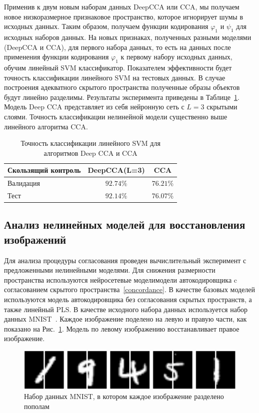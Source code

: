 \documentclass[12pt]{article}
\begin{document}
	Применив к двум новым наборам данных DeepCCA или CCA, мы получаем новое низкоразмерное признаковое пространство, которое игнорирует шумы в исходных данных. Таким образом, получаем функции кодирования $\varphi_1$ и $\psi_1$ для исходных наборов данных. На новых признаках, полученных разными моделями (DeepCCA и CCA), для первого набора данных, то есть на данных после применения функции кодирования $\varphi_1$ к первому набору исходных данных, обучим линейный SVM классификатор. Показателем эффективности будет точность классификации линейного SVM на тестовых данных. В случае построения адекватного скрытого пространства полученные образы объектов будут линейно разделимы. Результаты эксперимента приведены в Таблице~\ref{tbl:1}. Модель Deep CCA представляет из себя нейронную сеть с $L=3$ скрытыми слоями. Точность классификации нелинейной модели существенно выше линейного алгоритма CCA.
	
	\begin{table}[h!]
		\caption{Точность классификации линейного SVM для алгоритмов Deep CCA и CCA}
		\centering
		\begin{tabular}{l|cc}
			\hline
			Скользящий контроль & DeepCCA(L=3) & CCA \\  \hline
			Валидация & $92.74\%$  &  $76.21\%$\\
			Тест & $92.14\%$ & $76.07\%$ \\
			\hline
		\end{tabular}
		\label{tbl:1}
	\end{table}
	
	\subsection{Анализ нелинейных моделей для восстановления изображений}
	Для анализа процедуры согласования проведен вычислительный эксперимент с предложенными нелинейными моделями.
	Для снижения размерности пространства используются нейросетевые моделимодели автокодировщика c согласованием скрытого пространства~\eqref{concordance}.
	В качестве базовых моделей используются модель автокодировщика без согласования скрытых пространств, а также линейный PLS. В качестве исходного набора данных используется набор данных MNIST~\cite{MNIST}. Каждое изображение поделено на левую и правую части, как показано на Рис.~\ref{fgr:3}. Модель по левому изображению восстанавливает правое изображение.
	
	\begin{figure}[h!]
		\begin{center}
			\includegraphics[width=\linewidth]{figures/left_right_mnist}
		\end{center}
		\caption{Набор данных MNIST, в котором каждое изображение разделено пополам}
		\label{fgr:3}
	\end{figure}
	
\end{document}
